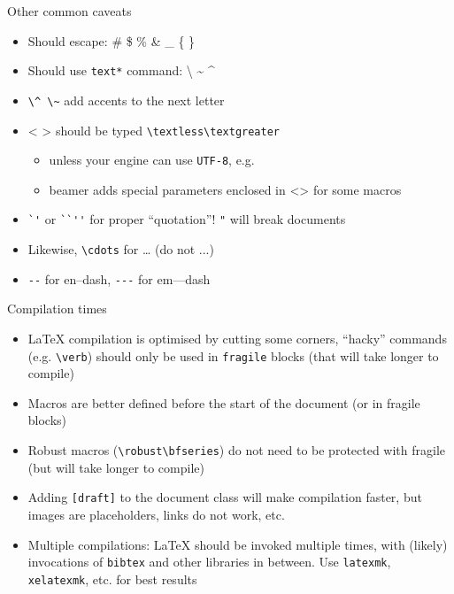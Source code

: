\documentclass[english]{beamer}
\let\olditem\item
\renewcommand{\item}{\setlength{\itemsep}{\fill}\olditem}
\newenvironment{sitemize}{\let\item\olditem \begin{itemize}}{\vfill\end{itemize}}
\let\textttt\texttt
\renewcommand{\texttt}[1]{\colorbox{gray!10}{\textttt{#1}}}
\begin{document}
\begin{frame}[fragile]{Other common caveats}
    \begin{itemize}
        \item Should escape: \# \$ \% \& \_ \{ \} 
        \item Should use \texttt{text*} command: \textbackslash{} \textasciitilde{} \textasciicircum{}
        \item \verb|\^ \~| add accents to the next letter
        \item{} < > should be typed \verb|\textless\textgreater| 
        \begin{sitemize}
            \item unless your engine can use \texttt{UTF-8}, e.g. 
            \item {beamer} adds special parameters enclosed in <> for some macros
        \end{sitemize} 
        \item \verb|`'| or \verb|``''| for proper ``quotation''! \verb|"| will break documents
        \item Likewise, \verb|\cdots| for \dots{} (do not ...)
        \item \verb|--| for en--dash, \verb|---| for em---dash
    \end{itemize}
\end{frame}

\begin{frame}[fragile]{Compilation times}
    \begin{itemize}
        \item \LaTeX{} compilation is optimised by cutting some corners, ``hacky'' commands (e.g. \verb|\verb|) should only be used in \texttt{fragile} blocks (that will take longer to compile)
        \item Macros are better defined before the start of the document (or in fragile blocks)
        \item Robust macros (\verb|\robust\bfseries|) do not need to be protected with fragile (but will take longer to compile)
        \item Adding \texttt{[draft]} to the document class will make compilation faster, but images are placeholders, links do not work, etc.
        \item Multiple compilations: \LaTeX{} should be invoked multiple times, with (likely) invocations of \texttt{bibtex} and other libraries in between. Use \texttt{latexmk}, \texttt{xelatexmk}, etc. for best results
    \end{itemize}
    
\end{frame}
\end{document}
